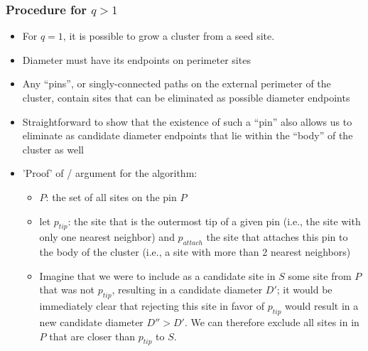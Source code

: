 \documentclass[11pt]{article}
\begin{document}
\subsubsection{Procedure for $q>1$}
\label{sec-4.2.4}

\begin{itemize}

\item For $q=1$, it is possible to grow a cluster from a seed site.\\
\label{sec-4.2.4.1}


\item Diameter must have its endpoints on perimeter sites\\
\label{sec-4.2.4.2}


\item Any ``pins'', or singly-connected paths on the external perimeter of the cluster, contain sites that can be eliminated as possible diameter endpoints\\
\label{sec-4.2.4.3}


\item Straightforward to show that the existence of such a ``pin'' also allows us to eliminate as candidate diameter endpoints that lie within the ``body'' of the cluster as well\\
\label{sec-4.2.4.4}


\item 'Proof' of / argument for the algorithm:\\
\label{sec-4.2.4.5}

\begin{itemize}

\item $P$: the set of all sites on the pin $P$\\
\label{sec-4.2.4.5.1}


\item let $p_{tip}$: the site that is the outermost tip of a given pin (i.e., the site with only one nearest neighbor) and $p_{attach}$ the site that attaches this pin to the body of the cluster (i.e., a site with more than 2 nearest neighbors)\\
\label{sec-4.2.4.5.2}


\item Imagine that we were to include as a candidate site in $S$ some site from $P$ that was not $p_{tip}$, resulting in a candidate diameter $D'$; it would be immediately clear that rejecting this site in favor of $p_{tip}$ would result in a new candidate diameter $D''>D'$.  We can therefore exclude all sites in in $P$ that are closer than $p_{tip}$ to $S$.\\
\label{sec-4.2.4.5.3}



\end{itemize}
\end{itemize}
\end{document}
